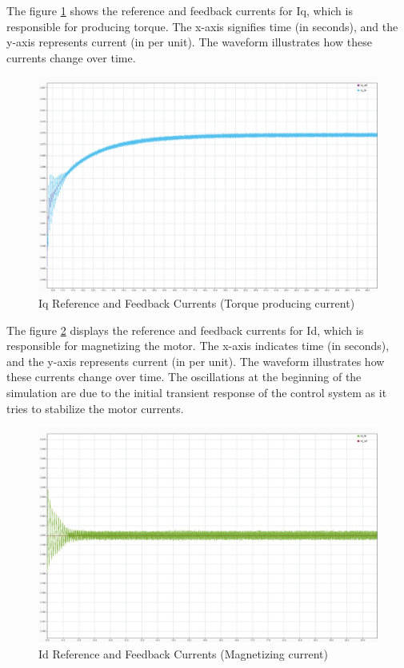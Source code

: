 The figure \ref{fig:current_response_Iq_ref_fb} shows the reference and feedback currents for Iq, which is responsible for producing torque. The x-axis signifies time (in seconds), and the y-axis represents current (in per unit). The waveform illustrates how these currents change over time. 

\begin{figure}[H]
	\centering
	\includegraphics[width=6in]{sections/section3/images/simulationResutls/Iq_ref_fb.png}
	\caption{Iq Reference and Feedback Currents (Torque producing current)}
	\label{fig:current_response_Iq_ref_fb}
\end{figure}


The figure \ref{fig:current_response_Id_ref_fb}  displays the reference and feedback currents for Id, which is responsible for magnetizing the motor. The x-axis indicates time (in seconds), and the y-axis represents current (in per unit). The waveform illustrates how these currents change over time. The oscillations at the beginning of the simulation are due to the initial transient response of the control system as it tries to stabilize the motor currents.

\begin{figure}[H]
	\centering
	\includegraphics[width=6in]{sections/section3/images/simulationResutls/Id_ref_fb.png}
	\caption{Id Reference and Feedback Currents (Magnetizing current)}
	\label{fig:current_response_Id_ref_fb}
\end{figure}




